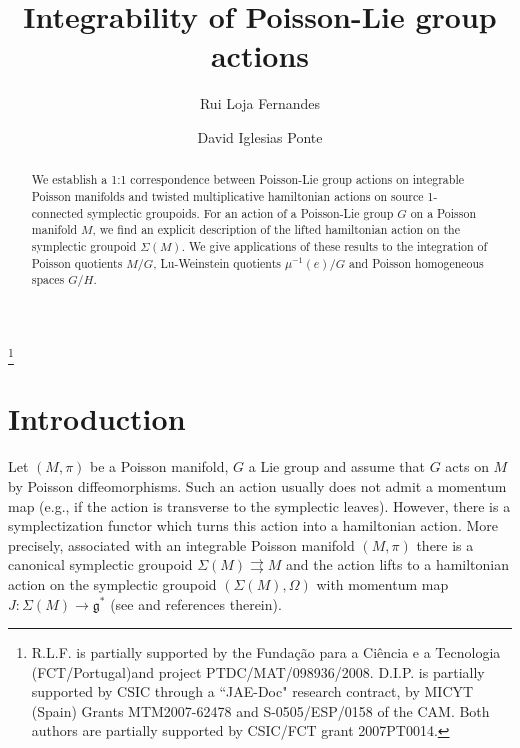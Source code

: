 \documentclass[a4paper,11pt]{amsart}
\theoremstyle{definition}
\theoremstyle{remark}
\begin{document}
\title{Integrability of Poisson-Lie group actions}
\author{Rui Loja Fernandes}
\address{Departamento de Matem\'{a}tica\\
Instituto Superior T\'{e}cnico\\1049-001 Lisboa\\ Portugal}
\thanks{R.L.F. is partially supported by the Funda\c{c}\~ao para a Ci\^encia e a Tecnologia
(FCT/Portugal)and project PTDC/MAT/098936/2008. D.I.P. is partially supported by CSIC through
a ``JAE-Doc" research contract, by MICYT (Spain) Grants  MTM2007-62478 and
S-0505/ESP/0158 of the CAM. Both authors are partially supported by CSIC/FCT grant 2007PT0014.}

\author{David Iglesias Ponte}
\address{Instituto de Ciencias Matem\'{a}ticas \\
CSIC-UAM-UC3M-UCM\\
C/ Serrano 123, 28006 Madrid\\ Spain}

\begin{abstract}
We establish a 1:1 correspondence between Poisson-Lie group
actions on integrable Poisson manifolds and twisted multiplicative
hamiltonian actions on source 1-connected symplectic groupoids.
For an action of a Poisson-Lie group $G$ on a Poisson manifold
$M$, we find an explicit description of the lifted hamiltonian
action on the symplectic groupoid $\Sigma(M)$. We give
applications of these results to the integration of Poisson
quotients $M/G$, Lu-Weinstein quotients $\mu^{-1}(e)/G$
and Poisson homogeneous spaces $G/H$.
\end{abstract}

\maketitle

\section*{Introduction}             \label{sec:introduction}           

Let $(M,\pi)$ be a Poisson manifold, $G$ a Lie group and assume that $G$ acts on $M$ by Poisson diffeomorphisms.
Such an action usually does not admit a momentum map (e.g., if the action is transverse to the symplectic
leaves). However, there is a symplectization functor which turns this action into a hamiltonian action. More
precisely, associated with an integrable Poisson manifold $(M,\pi)$ there is a canonical symplectic groupoid
$\Sigma(M){\rightrightarrows} M$ and the action lifts to a hamiltonian action on the symplectic groupoid $(\Sigma(M),\Omega)$
with momentum map $J:\Sigma(M)\to{\mathfrak{g}}^*$ (see \cite{Fer,FerOrRa,Xu0} and references therein).
\end{document}
